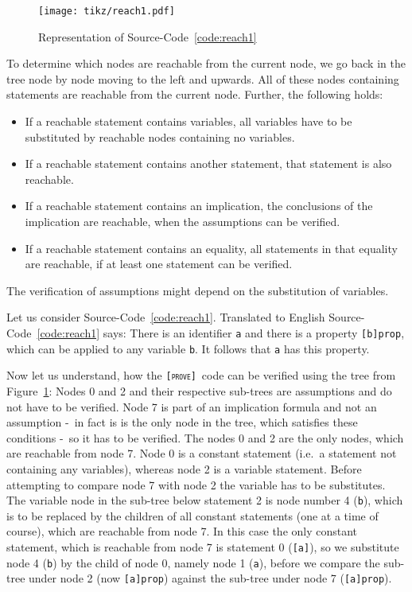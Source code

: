 \documentclass[british]{article}
\newcommand\prv{bc}
\newcommand\m[1]{\texttt{#1}}
\newcommand\name{\texttt{\textsc{[prove]}}}
\newcommand\scref[1]{Source-Code~\ref{code:#1}}
\newcommand\figref[1]{Figure~\ref{fig:#1}}
\begin{document}
\begin{figure}[!h]
\caption{Representation of \scref{reach1}}\label{fig:reach1}
\centering
\texttt{[image: tikz/reach1.pdf]}
\end{figure}

To determine which nodes are reachable from the current node, we go back in the tree node by node moving to the left and upwards. All of these nodes containing statements are reachable from the current node. Further, the following holds:

\begin{itemize}
	\item
		If a reachable statement contains variables, all variables have to be substituted by reachable nodes containing no variables.
	\item
		If a reachable statement contains another statement, that statement is also reachable.
	\item
		If a reachable statement contains an implication, the conclusions of the implication are reachable, when the assumptions can be verified. 
	\item
		If a reachable statement contains an equality, all statements in that equality are reachable, if at least one statement can be verified.
\end{itemize}

The verification of assumptions might depend on the substitution of variables.
\newline

Let us consider \scref{reach1}. Translated to English \scref{reach1} says: There is an identifier \m{a} and there is a property \m{[b]prop}, which can be applied to any variable \m{b}. It follows that \m{a} has this property.
\newline

Now let us understand, how the \name\ code can be verified using the tree from \figref{reach1}: Nodes 0 and 2 and their respective sub-trees are assumptions and do not have to be verified. Node 7 is part of an implication formula and not an assumption -\ in fact is is the only node in the tree, which satisfies these conditions -\ so it has to be verified. The nodes 0 and 2 are the only nodes, which are reachable from node 7. Node 0 is a constant statement (i.e.\ a statement not containing any variables), whereas node 2 is a variable statement. Before attempting to compare node 7 with node 2 the variable has to be substitutes. The variable node in the sub-tree below statement 2 is node number 4 (\m{b}), which is to be replaced by the children of all constant statements (one at a time of course), which are reachable from node 7. In this case the only constant statement, which is reachable from node 7 is statement 0 (\m{[a]}), so we substitute node 4 (\m{b}) by the child of node 0, namely node 1 (\m{a}), before we compare the sub-tree under node 2 (now \m{[a]prop}) against the sub-tree under node 7 (\m{[a]prop}).
\newline
\end{document}
